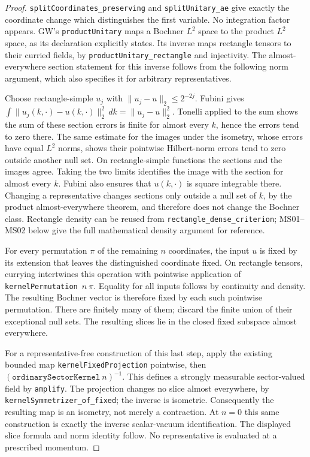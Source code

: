 \documentclass[11pt,a4paper]{article}
\theoremstyle{remark}\newtheorem{remark}[theorem]{Remark}
\begin{document}
\begin{proof}
\texttt{splitCoordinates\_preserving} and \texttt{splitUnitary\_ae} give exactly the coordinate change which distinguishes the first variable. No integration factor appears. GW's \texttt{productUnitary} maps a Bochner $L^2$ space to the product $L^2$ space, as its declaration explicitly states. Its inverse maps rectangle tensors to their curried fields, by \texttt{productUnitary\_rectangle} and injectivity. The almost-everywhere section statement for this inverse follows from the following norm argument, which also specifies it for arbitrary representatives.

Choose rectangle-simple $u_j$ with $\|u_j-u\|_2\leq2^{-2j}$. Fubini gives
$\int\|u_j(k,\cdot)-u(k,\cdot)\|_2^2\,dk=\|u_j-u\|_2^2$.
Tonelli applied to the sum shows the sum of these section errors is finite for almost every $k$, hence the errors tend to zero there. The same estimate for the images under the isometry, whose errors have equal $L^2$ norms, shows their pointwise Hilbert-norm errors tend to zero outside another null set. On rectangle-simple functions the sections and the images agree. Taking the two limits identifies the image with the section for almost every $k$. Fubini also ensures that $u(k,\cdot)$ is square integrable there. Changing a representative changes sections only outside a null set of $k$, by the product almost-everywhere theorem, and therefore does not change the Bochner class. Rectangle density can be reused from \texttt{rectangle\_dense\_criterion}; MS01--MS02 below give the full mathematical density argument for reference.

For every permutation $\pi$ of the remaining $n$ coordinates, the input $u$ is fixed by its extension that leaves the distinguished coordinate fixed. On rectangle tensors, currying intertwines this operation with pointwise application of \texttt{kernelPermutation}\ $n\ \pi$. Equality for all inputs follows by continuity and density. The resulting Bochner vector is therefore fixed by each such pointwise permutation. There are finitely many of them; discard the finite union of their exceptional null sets. The resulting slices lie in the closed fixed subspace almost everywhere.

For a representative-free construction of this last step, apply the existing bounded map \texttt{kernelFixedProjection} pointwise, then $(\texttt{ordinarySectorKernel}\ n)^{-1}$. This defines a strongly measurable sector-valued field by \texttt{amplify}. The projection changes no slice almost everywhere, by \texttt{kernelSymmetrizer\_of\_fixed}; the inverse is isometric. Consequently the resulting map is an isometry, not merely a contraction. At $n=0$ this same construction is exactly the inverse scalar-vacuum identification. The displayed slice formula and norm identity follow. No representative is evaluated at a prescribed momentum.
\end{proof}
\end{document}
